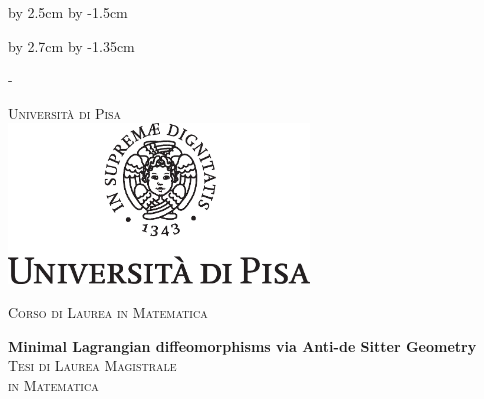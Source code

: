   \advance\vsize by 2.5cm %
\advance\voffset by -1.5cm %


\begin{titlingpage}


\advance\hsize by 2.7cm %
\advance\hoffset by -1.35cm %




\calccentering{\unitlength}
\begin{adjustwidth*}{\unitlength}{-\unitlength}


\thispagestyle{empty}
\begin{center}
\large
\textsc{\Large Università di Pisa\\}
\vspace{0.6cm}
\includegraphics[width=8cm]{cherubino.eps}

\vspace{0.8cm}
\textsc{\Large{Corso di Laurea in Matematica}}\\



\vspace{2.5cm}


{\LARGE\textbf{Minimal Lagrangian diffeomorphisms via Anti-de Sitter Geometry}}
\\[2.0cm]

\textsc{Tesi di Laurea Magistrale \\[0.2cm] in Matematica}\\
\vspace{0.5cm}



\vspace{0.2cm}

%
%


\end{center}
\end{adjustwidth*}
\end{titlingpage}
